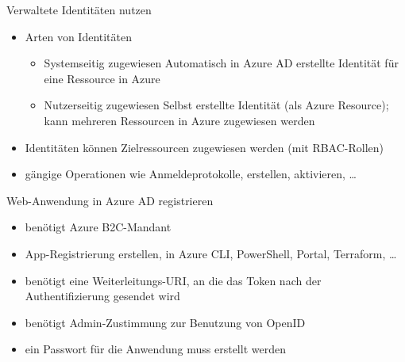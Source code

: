 \begin{flashcard}[Definition]{Verwaltete Identitäten nutzen}
  \begin{itemize}
    \item Arten von Identitäten
    \begin{itemize}
      \item Systemseitig zugewiesen\newline
        Automatisch in Azure AD erstellte Identität für eine Ressource in Azure
      \item Nutzerseitig zugewiesen\newline
        Selbst erstellte Identität (als Azure Resource); kann mehreren Ressourcen in Azure zugewiesen werden
    \end{itemize}
    \item Identitäten können Zielressourcen zugewiesen werden (mit RBAC-Rollen)
    \item gängige Operationen wie Anmeldeprotokolle, erstellen, aktivieren, \ldots
  \end{itemize}
\end{flashcard}



\begin{flashcard}[Definition]{Web-Anwendung in Azure AD registrieren}
  \begin{itemize}
    \item benötigt Azure B2C-Mandant
    \item App-Registrierung erstellen, in Azure CLI, PowerShell, Portal, Terraform, \ldots
    \item benötigt eine Weiterleitungs-URI, an die das Token nach der Authentifizierung gesendet wird
    \item benötigt Admin-Zustimmung zur Benutzung von OpenID
    \item ein Passwort für die Anwendung muss erstellt werden
  \end{itemize}
\end{flashcard}
